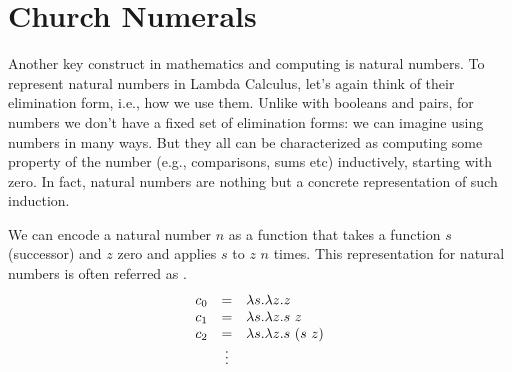 
\section{Church Numerals}
\label{sec:lcc:church-numerals}

\begin{gram}
\label{grm:lcc:church-numerals::intro}
Another key construct in mathematics and computing is natural numbers.
%
To represent natural numbers in Lambda Calculus, let's again think of their elimination form, i.e., how we use them.
%
Unlike with booleans and pairs, for numbers we don't have a fixed set of elimination forms: we can imagine using numbers in many ways.
%
But they all can be characterized as computing some property of the
number (e.g., comparisons, sums etc) inductively, starting with zero.
%
In fact, natural numbers are nothing but a concrete representation of such induction.
\end{gram}

\begin{gram}
\label{grm:lcc:church-numerals::encoding}
We can encode a natural number $n$ as a
function that takes a function $s$ (successor) and $z$ zero and
applies $s$ to $z$ $n$ times.
%
This representation for natural numbers is often referred as
%
.  
%
\[
\begin{array}{rcl}
c_0 & = & \lambda s. \lambda z. z\\
c_1 & = & \lambda s. \lambda z. s~z \\
c_2 & = & \lambda s. \lambda z. s~(s~z)\\
    & \vdots & 
\end{array}
\]
\end{gram}


